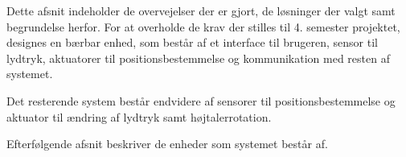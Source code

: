 
Dette afsnit indeholder de overvejelser der er gjort, de løsninger der valgt samt begrundelse herfor.
For at overholde de krav der stilles til 4. semester projektet, designes en bærbar enhed, som består af et interface til brugeren, sensor til lydtryk, aktuatorer til positionsbestemmelse og kommunikation med resten af systemet.

Det resterende system består endvidere af sensorer til positionsbestemmelse og aktuator til ændring af lydtryk samt højtalerrotation.

Efterfølgende afsnit beskriver de enheder som systemet består af.